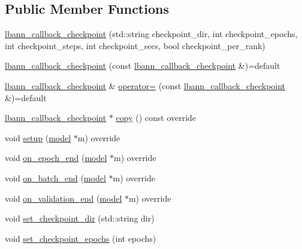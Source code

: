\subsection*{Public Member Functions}
\begin{DoxyCompactItemize}
\item 
\hyperlink{classlbann_1_1lbann__callback__checkpoint_a865e633d1f041e3f2e5465b1d05f3603}{lbann\+\_\+callback\+\_\+checkpoint} (std\+::string checkpoint\+\_\+dir, int checkpoint\+\_\+epochs, int checkpoint\+\_\+steps, int checkpoint\+\_\+secs, bool checkpoint\+\_\+per\+\_\+rank)
\item 
\hyperlink{classlbann_1_1lbann__callback__checkpoint_a954c1b3f33fc293151d5bf37a8053628}{lbann\+\_\+callback\+\_\+checkpoint} (const \hyperlink{classlbann_1_1lbann__callback__checkpoint}{lbann\+\_\+callback\+\_\+checkpoint} \&)=default
\item 
\hyperlink{classlbann_1_1lbann__callback__checkpoint}{lbann\+\_\+callback\+\_\+checkpoint} \& \hyperlink{classlbann_1_1lbann__callback__checkpoint_aab65cb67b53e6af00142a9dc665f9ce8}{operator=} (const \hyperlink{classlbann_1_1lbann__callback__checkpoint}{lbann\+\_\+callback\+\_\+checkpoint} \&)=default
\item 
\hyperlink{classlbann_1_1lbann__callback__checkpoint}{lbann\+\_\+callback\+\_\+checkpoint} $\ast$ \hyperlink{classlbann_1_1lbann__callback__checkpoint_a63dc49f38f063f9b85d9abdf8b2855aa}{copy} () const override
\item 
void \hyperlink{classlbann_1_1lbann__callback__checkpoint_a383654a7bb70672dfc9fef679f4b509f}{setup} (\hyperlink{classlbann_1_1model}{model} $\ast$m) override
\item 
void \hyperlink{classlbann_1_1lbann__callback__checkpoint_a406bfba673e503e94ae6eb57aff6a78e}{on\+\_\+epoch\+\_\+end} (\hyperlink{classlbann_1_1model}{model} $\ast$m) override
\item 
void \hyperlink{classlbann_1_1lbann__callback__checkpoint_a476527e2b7b44dd3623e01f63ddb5f78}{on\+\_\+batch\+\_\+end} (\hyperlink{classlbann_1_1model}{model} $\ast$m) override
\item 
void \hyperlink{classlbann_1_1lbann__callback__checkpoint_a5fb4288c03b1ce14681b72562e9471b2}{on\+\_\+validation\+\_\+end} (\hyperlink{classlbann_1_1model}{model} $\ast$m) override
\item 
void \hyperlink{classlbann_1_1lbann__callback__checkpoint_adc9b6a01e100893c2dd0cfc7090c4079}{set\+\_\+checkpoint\+\_\+dir} (std\+::string dir)
\item 
void \hyperlink{classlbann_1_1lbann__callback__checkpoint_a718cf388085e51253a84c494511d1fb7}{set\+\_\+checkpoint\+\_\+epochs} (int epochs)

\end{DoxyCompactItemize}
